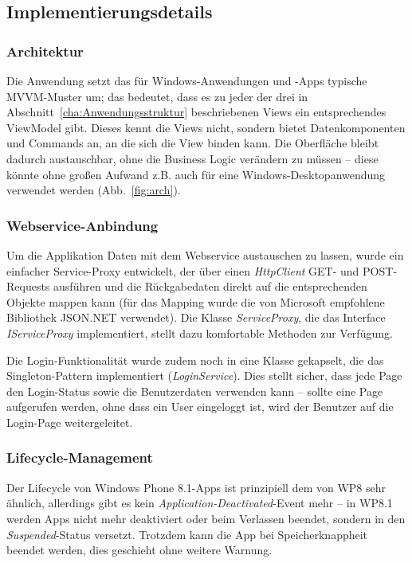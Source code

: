 \documentclass[a4paper,ngerman]{scrartcl}
\begin{document}
\subsection{Implementierungsdetails}
\subsubsection{Architektur}
Die Anwendung setzt das für Windows-Anwendungen und -Apps typische MVVM-Muster um; das bedeutet, dass es zu jeder der drei in Abschnitt~\ref{cha:Anwendungsstruktur} beschriebenen Views ein entsprechendes ViewModel gibt. Dieses kennt die Views nicht, sondern bietet Datenkomponenten und Commands an, an die sich die View binden kann. Die Oberfläche bleibt dadurch austauschbar, ohne die Business Logic verändern zu müssen -- diese könnte ohne großen Aufwand z.B. auch für eine Windows-Desktopanwendung verwendet werden (Abb.~\ref{fig:arch}). 


\subsubsection{Webservice-Anbindung}
Um die Applikation Daten mit dem Webservice austauschen zu lassen, wurde ein einfacher Service-Proxy entwickelt, der über einen \textit{HttpClient} GET- und POST-Requests ausführen und die Rückgabedaten direkt auf die entsprechenden Objekte mappen kann (für das Mapping wurde die von Microsoft empfohlene Bibliothek JSON.NET verwendet). Die Klasse \textit{ServiceProxy}, die das Interface \textit{IServiceProxy} implementiert, stellt dazu komfortable Methoden zur Verfügung. 

Die Login-Funktionalität wurde zudem noch in eine Klasse gekapselt, die das Singleton-Pattern implementiert (\textit{LoginService}). Dies stellt sicher, dass jede Page den Login-Status sowie die Benutzerdaten verwenden kann -- sollte eine Page aufgerufen werden, ohne dass ein User eingeloggt ist, wird der Benutzer auf die Login-Page weitergeleitet.

\subsubsection{Lifecycle-Management}
Der Lifecycle von Windows Phone 8.1-Apps ist prinzipiell dem von WP8 sehr ähnlich, allerdings gibt es kein \textit{Application-Deactivated}-Event mehr -- in WP8.1 werden Apps nicht mehr deaktiviert oder beim Verlassen beendet, sondern in den \textit{Suspended}-Status versetzt. Trotzdem kann die App bei Speicherknappheit beendet werden, dies geschieht ohne weitere Warnung.
\end{document}
